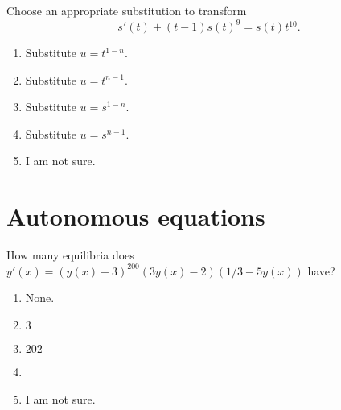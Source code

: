 \documentclass[t, 14pt]{beamer}
\begin{document}
\begin{frame}[t]
  Choose an appropriate substitution to transform
  \[
    s'(t) + (t-1)s(t)^{9} = s(t) t^{10}.
  \]

  \begin{enumerate} 
    \item Substitute \(u = t^{1-n}\).
    \item Substitute \(u = t^{n-1}\).
    \item Substitute \(u = s^{1-n}\).
    \item Substitute \(u = s^{n-1}\).
    \item I am not sure.
  \end{enumerate} 
\end{frame}

\section{Autonomous equations}

\begin{frame}[t]
  How many equilibria does \(y'(x) = (y(x) + 3)^{200} (3y(x) - 2) (1/3 - 5y(x))\) have?

  \begin{enumerate}
    \item None.
    \item \(3\)
    \item \(202\)
    \item
    \item I am not sure.
  \end{enumerate}
\end{frame}
\end{document}
